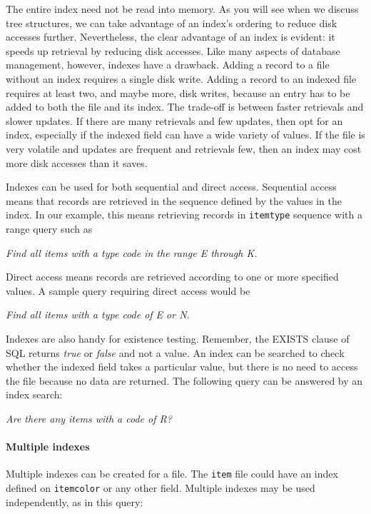 \documentclass[
]{article}
\begin{document}
The entire index need not be read into memory. As you will see when we
discuss tree structures, we can take advantage of an index's ordering to
reduce disk accesses further. Nevertheless, the clear advantage of an
index is evident: it speeds up retrieval by reducing disk accesses. Like
many aspects of database management, however, indexes have a drawback.
Adding a record to a file without an index requires a single disk write.
Adding a record to an indexed file requires at least two, and maybe
more, disk writes, because an entry has to be added to both the file and
its index. The trade-off is between faster retrievals and slower
updates. If there are many retrievals and few updates, then opt for an
index, especially if the indexed field can have a wide variety of
values. If the file is very volatile and updates are frequent and
retrievals few, then an index may cost more disk accesses than it saves.

Indexes can be used for both sequential and direct access. Sequential
access means that records are retrieved in the sequence defined by the
values in the index. In our example, this means retrieving records in
\texttt{itemtype} sequence with a range query such as

\emph{Find all items with a type code in the range E through K.}

Direct access means records are retrieved according to one or more
specified values. A sample query requiring direct access would be

\emph{Find all items with a type code of E or N.}

Indexes are also handy for existence testing. Remember, the EXISTS
clause of SQL returns \emph{true} or \emph{false} and not a value. An index can be
searched to check whether the indexed field takes a particular value,
but there is no need to access the file because no data are returned.
The following query can be answered by an index search:

\emph{Are there any items with a code of R?}

\hypertarget{multiple-indexes}{%
\paragraph*{Multiple indexes}\label{multiple-indexes}}

Multiple indexes can be created for a file. The \texttt{item} file could have
an index defined on \texttt{itemcolor} or any other field. Multiple indexes may
be used independently, as in this query:
\end{document}
